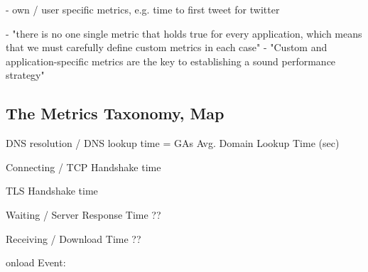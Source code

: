 - own / user specific metrics, e.g. time to first tweet for twitter 


- "there is no one single metric that holds true for every application, which means that we must carefully define custom metrics in each case"
-  "Custom and application-specific metrics are the key to establishing a sound performance strategy"









\subsection{The Metrics Taxonomy, Map}
















DNS resolution / DNS lookup time %
= GAs Avg. Domain Lookup Time (sec) %


Connecting / TCP Handshake time %


TLS Handshake time %


Waiting / Server Response Time ?? %


Receiving / Download Time ?? %




onload Event: %



